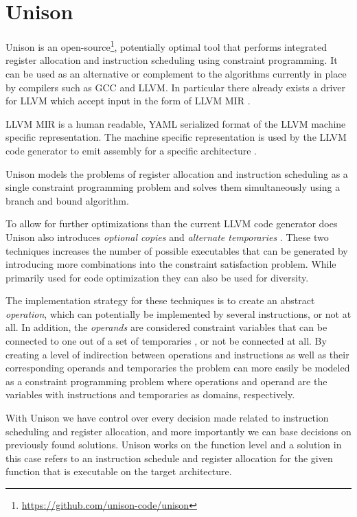 \section{Unison}
\label{sec:unison}

Unison is an open-source\footnote{\url{https://github.com/unison-code/unison}},
potentially optimal tool that performs integrated register allocation and instruction
scheduling using constraint programming. It can be used as an alternative or complement to
the algorithms currently in place by compilers such as GCC and LLVM. In particular there
already exists a driver for LLVM which accept input in the form of LLVM MIR \cite{unison-docs}.

LLVM MIR is a human readable, YAML serialized format of the LLVM machine specific
representation\cite{llvm-mir-lang-ref}. The machine specific representation is used by the
LLVM code generator to emit assembly for a specific architecture \cite{welcome-to-backend}.

Unison models the problems of register allocation and instruction scheduling as a single
constraint programming problem and solves them simultaneously using a branch and bound
algorithm\cite{unison-docs,reg-alloc-inst-sched-uni,unison-src}.

To allow for further optimizations than the current LLVM code generator does Unison also
introduces \textit{optional copies} and \textit{alternate temporaries}
\cite{reg-alloc-inst-sched-uni}. These two techniques increases the number of possible
executables that can be generated by introducing more combinations into the constraint
satisfaction problem. While primarily used for code optimization they can also be used for
diversity.

The implementation strategy for these techniques is to create an abstract \textit{operation},
which can potentially be implemented by several instructions, or not at all. In addition,
the \textit{operands} are considered constraint variables that can be connected to one out
of a set of temporaries \cite{unison-docs}, or not be connected at all. By creating a
level of indirection between operations and instructions as well as their corresponding
operands and temporaries the problem can more easily be modeled as a constraint
programming problem where operations and operand are the variables with instructions and
temporaries as domains, respectively.

With Unison we have control over every decision made related to instruction scheduling and
register allocation, and more importantly we can base decisions on previously found solutions.
Unison works on the function level and a solution in this case refers to an instruction
schedule and register allocation for the given function that is executable on the target
architecture.

